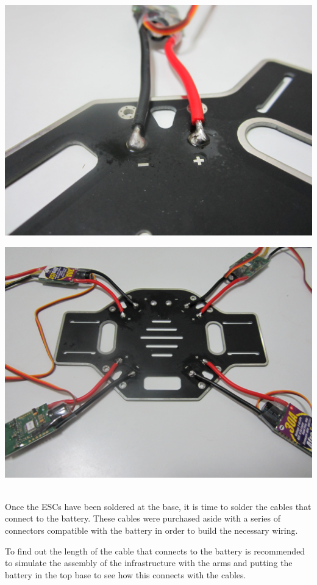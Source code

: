 \documentclass[12pt, a4paper,twoside]{tesi_upf}
\begin{document}
\begin{minipage}{0.5\textwidth}
  \centering
  \includegraphics[width=0.8\linewidth]{Images/Mounting/IMG_0379.jpg}
  \label{fig:app1}
\end{minipage}%
\begin{minipage}{0.5\textwidth}
  \centering
  \includegraphics[width=0.8\linewidth]{Images/Mounting/IMG_0384.jpg}
  \label{fig:app2}
\end{minipage}
\\[12pt]


Once the ESCs have been soldered at the base, it is time to solder the cables that connect to the battery. These cables were purchased aside with a series of connectors compatible with the battery in order to build the necessary wiring.

To find out the length of the cable that connects to the battery is recommended to simulate the assembly of the infrastructure with the arms and putting the battery in the top base to see how this connects with the cables.
\\[12 pt]
\end{document}
